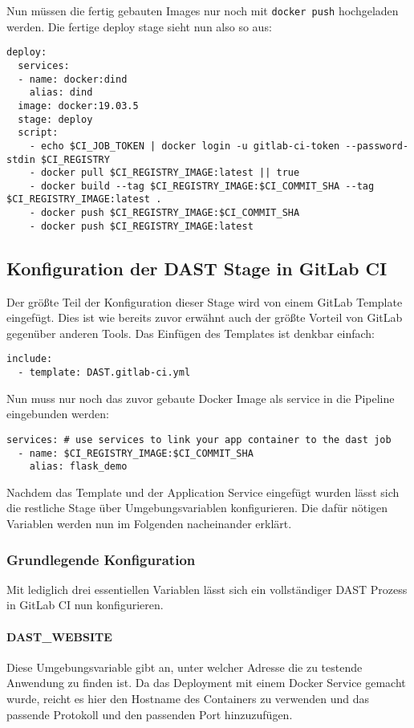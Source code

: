 Nun müssen die fertig gebauten Images nur noch mit \texttt{docker push} hochgeladen werden.
Die fertige deploy stage sieht nun also so aus:

\begin{verbatim}
deploy:
  services:
  - name: docker:dind
    alias: dind
  image: docker:19.03.5
  stage: deploy
  script:
    - echo $CI_JOB_TOKEN | docker login -u gitlab-ci-token --password-stdin $CI_REGISTRY
    - docker pull $CI_REGISTRY_IMAGE:latest || true
    - docker build --tag $CI_REGISTRY_IMAGE:$CI_COMMIT_SHA --tag $CI_REGISTRY_IMAGE:latest .
    - docker push $CI_REGISTRY_IMAGE:$CI_COMMIT_SHA
    - docker push $CI_REGISTRY_IMAGE:latest

\end{verbatim}

\subsection{Konfiguration der DAST Stage in GitLab CI}

Der größte Teil der Konfiguration dieser Stage wird von einem GitLab Template eingefügt.\cite{DynamicApplicationSecurity}
Dies ist wie bereits zuvor erwähnt auch der größte Vorteil von GitLab gegenüber anderen Tools.
Das Einfügen des Templates ist denkbar einfach:
\begin{verbatim}
include:
  - template: DAST.gitlab-ci.yml
\end{verbatim}

Nun muss nur noch das zuvor gebaute Docker Image als service in die Pipeline eingebunden werden:
\begin{verbatim}
services: # use services to link your app container to the dast job
  - name: $CI_REGISTRY_IMAGE:$CI_COMMIT_SHA
    alias: flask_demo
\end{verbatim}

Nachdem das Template und der Application Service eingefügt wurden lässt sich die restliche Stage über Umgebungsvariablen konfigurieren.
Die dafür nötigen Variablen werden nun im Folgenden nacheinander erklärt.

\subsubsection{Grundlegende Konfiguration}

Mit lediglich drei essentiellen Variablen lässt sich ein vollständiger DAST Prozess in GitLab CI nun konfigurieren.

\paragraph{DAST\_WEBSITE} Diese Umgebungsvariable gibt an, unter welcher Adresse die zu testende Anwendung zu finden ist.
Da das Deployment mit einem Docker Service gemacht wurde, reicht es hier den Hostname des Containers zu verwenden und das passende Protokoll und den passenden Port hinzuzufügen.
